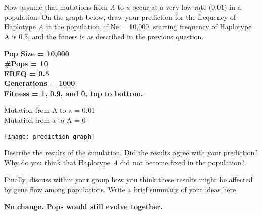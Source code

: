 \documentclass[11pt, addpoints]{exam}
\begin{document}
\begin{questions}
\newpage

\question
Now assume that mutations from \emph{A} to \emph{a} occur
at a very low rate (0.01) in a population. On the graph below, draw your
prediction for the frequency of Haplotype \emph{A} in the population, if
Ne = 10,000, starting frequency of Haplotype A is 0.5, and the fitness
is as described in the previous question.

\ifprintanswers
	{\bfseries %
	Pop Size = 10,000\\
	\#Pops = 10\\
	FREQ = 0.5\\
	Generations = 1000\\	
	Fitness = 1, 0.9, and 0, top to bottom. 
	
	Mutation from A to a = 0.01\\
	Mutation from a to A = 0}\vspace*{13\baselineskip}
\else
	\begin{center}
		\texttt{[image: prediction\_graph]}
	\end{center}
\fi


\question[1]
Describe the results of the simulation. Did the results
agree with your prediction? Why do you think that Haplotype \emph{A} did
not become fixed in the population?

\question[2]
Finally, discuss within your group how you think these
results might be affected by gene flow among populations. Write a brief
summary of your ideas here.

\ifprintanswers
	\textbf{No change. Pops would still evolve together.}
\else
\fi
\end{questions}
\end{document}
